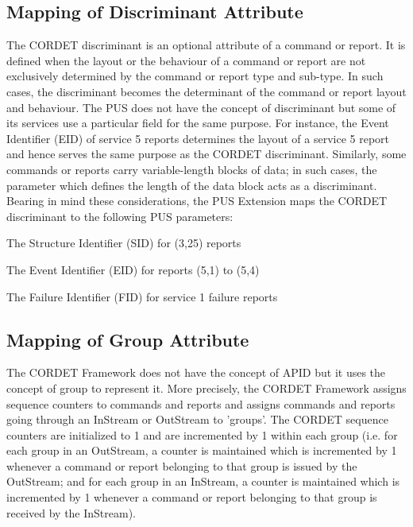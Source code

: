 \documentclass{pnp_article}
\begin{document}
\subsection{Mapping of Discriminant Attribute}\label{sec:mapDisc}
The CORDET discriminant is an optional attribute of a command or report. It is defined when the layout or the behaviour of a command or report are not exclusively determined by the command or report type and sub-type. In such cases, the discriminant becomes the determinant of the command or report layout and behaviour. The PUS does not have the concept of discriminant but some of its services use a particular field for the same purpose. For instance, the Event Identifier (EID) of service 5 reports determines the layout of a service 5 report and hence serves the same purpose as the CORDET discriminant. Similarly, some commands or reports carry variable-length blocks of data; in such cases, the parameter which defines the length of the data block acts as a discriminant. Bearing in mind these considerations, the PUS Extension maps the CORDET discriminant to the following PUS parameters:

\begin{fw_itemize}
\item The Structure Identifier (SID) for (3,25) reports
\item The Event Identifier (EID) for reports (5,1) to (5,4)
\item The Failure Identifier (FID) for service 1 failure reports
\end{fw_itemize}

\subsection{Mapping of Group Attribute}\label{sec:mapGroup}
The CORDET Framework does not have the concept of APID but it uses the concept of group to represent it. More precisely, the CORDET Framework assigns sequence counters to commands and reports and assigns commands and reports going through an InStream or OutStream to 'groups'. The CORDET sequence counters are initialized to 1 and are incremented by 1 within each group (i.e. for each group in an OutStream, a counter is maintained which is incremented by 1 whenever a command or report belonging to that group is issued by the OutStream; and for each group in an InStream, a counter is maintained which is incremented by 1 whenever a command or report belonging to that group is received by the InStream). 
\end{document}
